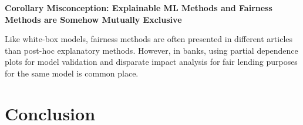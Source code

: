 \documentclass{article}
\begin{document}
\textbf{Corollary Misconception: Explainable ML Methods and Fairness Methods are Somehow Mutually Exclusive}

Like white-box models, fairness methods are often presented in different articles than post-hoc explanatory methods. However, in banks, using partial dependence plots for model validation and disparate impact analysis for fair lending purposes for the same model is common place.

\section{Conclusion}




\end{document}
